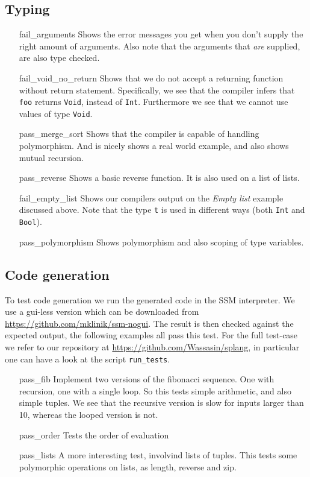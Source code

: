 \documentclass[14pt]{amsart}
\begin{document}
\subsection{Typing}
\begin{itemize}
	\item[fail\_arguments] Shows the error messages you get when you don't supply the right amount of arguments. Also note that the arguments that \emph{are} supplied, are also type checked.
	\item[fail\_void\_no\_return] Shows that we do not accept a returning function without return statement. Specifically, we see that the compiler infers that \texttt{foo} returns \texttt{Void}, instead of \texttt{Int}. Furthermore we see that we cannot use values of type \texttt{Void}.
	\item[pass\_merge\_sort] Shows that the compiler is capable of handling polymorphism. And is nicely shows a real world example, and also shows mutual recursion.
	\item[pass\_reverse] Shows a basic reverse function. It is also used on a list of lists.
	\item[fail\_empty\_list] Shows our compilers output on the \emph{Empty list} example discussed above. Note that the type \texttt{t} is used in different ways (both \texttt{Int} and \texttt{Bool}).
	\item[pass\_polymorphism] Shows polymorphism and also scoping of type variables.
\end{itemize}

\subsection{Code generation}
To test code generation we run the generated code in the SSM interpreter. We use a gui-less version which can be downloaded from \url{https://github.com/mklinik/ssm-nogui}. The result is then checked against the expected output, the following examples all pass this test. For the full test-case we refer to our repository at \url{https://github.com/Wassasin/splang}, in particular one can have a look at the script \texttt{run\_tests}.

\begin{itemize}
	\item[pass\_fib] Implement two versions of the fibonacci sequence. One with recursion, one with a single loop. So this tests simple arithmetic, and also simple tuples. We see that the recursive version is slow for inputs larger than 10, whereas the looped version is not.
	\item[pass\_order] Tests the order of evaluation
	\item[pass\_lists] A more interesting test, involvind lists of tuples. This tests some polymorphic operations on lists, as length, reverse and zip.
\end{itemize}
\end{document}
